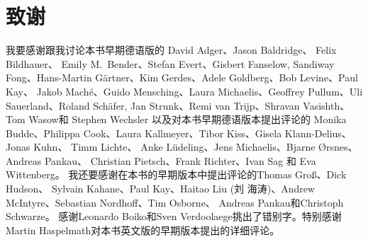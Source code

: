 \section*{致谢}

我要感谢跟我讨论本书早期德语版的
David Adger、Jason Baldridge、 Felix Bildhauer、
Emily M.\ Bender、Stefan Evert、Gisbert Fanselow, 
Sandiway Fong、Hans-Martin Gärtner、Kim Gerdes、Adele Goldberg、Bob Levine、Paul Kay、
Jakob Maché、Guido Mensching、Laura Michaelis、Geoffrey Pullum、Uli Sauerland、Roland Schä\-fer,
Jan Strunk、Remi van Trijp、Shravan Vasishth、Tom Wasow和
Stephen Wechsler
%
以及对本书早期德语版本提出评论的
Monika Budde、Philippa Cook、Laura Kallmeyer、Tibor Kiss、Gisela Klann-Delius、 Jonas Kuhn、
Timm Lichte、%
Anke Lüdeling、Jens Michaelis、Bjarne Ørsnes、Andreas Pankau、    %
Christian Pietsch、Frank Richter、Ivan Sag
和
Eva Wittenberg。
%
%
我还要感谢在本书的早期版本中提出评论的Thomas Groß、Dick Hudson、
Sylvain Kahane、Paul Kay、Haitao Liu (刘 海涛)、Andrew McIntyre、Sebastian Nordhoff、Tim Osborne、
Andreas Pankau和Christoph Schwarze。
感谢Leonardo Boiko和Sven Verdoolaege挑出了错别字。特别感谢Martin Haspelmath对本书英文版的早期版本提出的详细评论。

